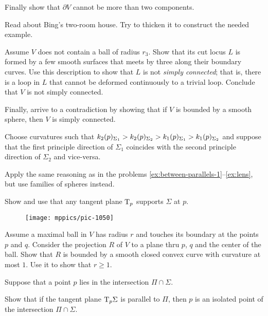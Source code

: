Finally show that $\partial V$ cannot be more than two components.

Read about Bing's two-room house.
Try to thicken it to construct the needed example.

Assume $V$ does not contain a ball of radius $r_3$.
Show that its cut locus $L$ is formed by a few smooth surfaces that meets by three along their boundary curves.
Use this description to show that $L$ is not \emph{simply connected}; that is, there is a loop in $L$ that cannot be deformed continuously to a trivial loop.
Conclude that $V$ is not simply connected.

Finally, arrive to a contradiction by showing that if $V$ is bounded by a smooth sphere, then $V$ is simply connected. 

\setcounter{eqtn}{0}

Choose curvatures such that 
$k_2(p)_{\Sigma_1}\z>k_2(p)_{\Sigma_2}> k_1(p)_{\Sigma_1}> k_1(p)_{\Sigma_2}$ and suppose that the first principle direction of $\Sigma_1$ coincides with the second principle direction of $\Sigma_2$ and vice-versa.

 Apply the same reasoning as in the problems \ref{ex:between-parallels-1}--\ref{ex:lens}, but use families of spheres instead.


 Show and use that any tangent plane $\mathrm{T}_p$ supports $\Sigma$ at $p$.

{

\begin{wrapfigure}{r}{25 mm}
\vskip-8mm
\centering
\texttt{[image: mppics/pic-1050]}
\vskip-0mm
\end{wrapfigure}

Assume a maximal ball in $V$ has radius $r$ and touches its boundary at the points $p$ and $q$.
Consider the projection $R$ of $V$ to a plane thru $p$, $q$ and the center of the ball.
Show that $R$ is bounded by a smooth closed convex curve with curvature at most $1$.
Use it to show that $r\ge 1$.

}
 

Suppose that a point $p$ lies in the intersection $\Pi\cap\Sigma$.

Show that if the tangent plane $\mathrm{T}_p\Sigma$ is parallel to $\Pi$,
then $p$ is an isolated point of the intersection $\Pi\cap\Sigma$.

